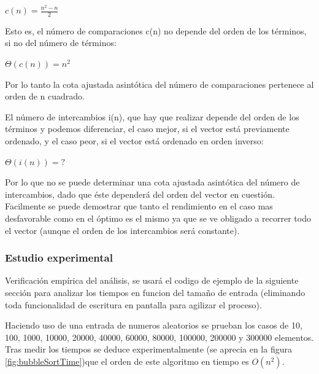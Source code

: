 \documentclass[8pt, A4]{article}    %
\begin{document}
\begin{center}
${\displaystyle c(n)={\frac {n^{2}-n}{2}}}$
\end{center}

Esto es, el número de comparaciones c(n) no depende del orden de los términos, si no del número de términos:

\begin{center}
${\displaystyle \Theta (c(n))=n^{2}\;}$
\end{center}

Por lo tanto la cota ajustada asintótica del número de comparaciones pertenece al orden de n cuadrado.

El número de intercambios i(n), que hay que realizar depende del orden de los términos y podemos diferenciar, el caso mejor, si el vector está previamente ordenado, y el caso peor, si el vector está ordenado en orden inverso:

\begin{center}
${\displaystyle \Theta (i(n))= ?\;}$
\end{center}

Por lo que no se puede determinar una cota ajustada asintótica del número de intercambios, dado que éste dependerá del orden del vector en cuestión.\\

Facilmente se puede demostrar que tanto el rendimiento en el caso mas desfavorable como en el óptimo es el mismo ya que se ve obligado a recorrer todo el vector (aunque el orden de los intercambios será constante).

\subsubsection{Estudio experimental}
Verificación empírica del análisis, se usará el codigo de ejemplo de la siguiente sección para analizar los tiempos en funcion del tamaño de entrada (eliminando toda funcionalidad de escritura en pantalla para agilizar el proceso).

Haciendo uso de una entrada de numeros aleatorios se prueban los casos de 10, 100, 1000, 10000, 20000, 40000, 60000, 80000, 100000, 200000 y 300000 elementos.
Tras medir los tiempos se deduce experimentalmente (se aprecia en la figura \ref{fig:bubbleSortTime})que el orden de este algoritmo en tiempo es $O(n^2)$.
\end{document}

